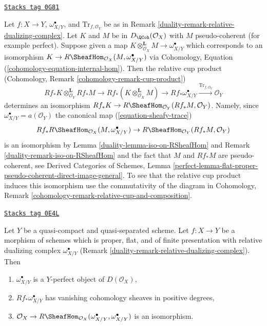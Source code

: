 \begin{remark}
\label{duality-remark-relative-dualizing-complex-relative-cup-product}
\href{https://stacks.math.columbia.edu/tag/0G81}{\texttt{Stacks tag 0G81}}

Let $f : X \to Y$, $\omega^\bullet_{X/Y}$, and $\text{Tr}_{f, \mathcal{O}_Y}$
be as in Remark \ref{duality-remark-relative-dualizing-complex}.
Let $K$ and $M$ be in $D_\QCoh(\mathcal{O}_X)$ with
$M$ pseudo-coherent (for example perfect). Suppose given a map
$K \otimes_{\mathcal{O}_X}^\mathbf{L} M \to \omega^\bullet_{X/Y}$
which corresponds to an isomorphism
$K \to R\SheafHom_{\mathcal{O}_X}(M, \omega^\bullet_{X/Y})$
via Cohomology, Equation (\ref{cohomology-equation-internal-hom}).
Then the relative cup product
(Cohomology, Remark \ref{cohomology-remark-cup-product})
$$
Rf_*K \otimes_{\mathcal{O}_Y}^\mathbf{L} Rf_*M
\to
Rf_*(K \otimes_{\mathcal{O}_X}^\mathbf{L} M)
\to
Rf_*\omega^\bullet_{X/Y}
\xrightarrow{\text{Tr}_{f, \mathcal{O}_Y}}
\mathcal{O}_Y
$$
determines an isomorphism
$Rf_*K \to R\SheafHom_{\mathcal{O}_Y}(Rf_*M, \mathcal{O}_Y)$.
Namely, since $\omega^\bullet_{X/Y} = a(\mathcal{O}_Y)$
the canonical map (\ref{equation-sheafy-trace})
$$
Rf_*R\SheafHom_{\mathcal{O}_X}(M, \omega^\bullet_{X/Y}) \to
R\SheafHom_{\mathcal{O}_Y}(Rf_*M, \mathcal{O}_Y)
$$
is an isomorphism by
Lemma \ref{duality-lemma-iso-on-RSheafHom} and
Remark \ref{duality-remark-iso-on-RSheafHom}
and the fact that $M$ and $Rf_*M$ are pseudo-coherent, see
Derived Categories of Schemes, Lemma
\ref{perfect-lemma-flat-proper-pseudo-coherent-direct-image-general}.
To see that the relative cup product
induces this isomorphism use the commutativity of the diagram in
Cohomology, Remark \ref{cohomology-remark-relative-cup-and-composition}.
\end{remark}

\begin{lemma}
\label{duality-lemma-properties-relative-dualizing}
\href{https://stacks.math.columbia.edu/tag/0E4L}{\texttt{Stacks tag 0E4L}}

Let $Y$ be a quasi-compact and quasi-separated scheme.
Let $f : X \to Y$ be a morphism of schemes which is
proper, flat, and of finite presentation with
relative dualizing complex $\omega_{X/Y}^\bullet$
(Remark \ref{duality-remark-relative-dualizing-complex}).
Then
\begin{enumerate}
\item $\omega_{X/Y}^\bullet$ is a $Y$-perfect object of $D(\mathcal{O}_X)$,
\item $Rf_*\omega_{X/Y}^\bullet$ has vanishing cohomology sheaves
in positive degrees,
\item $\mathcal{O}_X \to
R\SheafHom_{\mathcal{O}_X}(\omega_{X/Y}^\bullet, \omega_{X/Y}^\bullet)$
is an isomorphism.
\end{enumerate}
\end{lemma}

